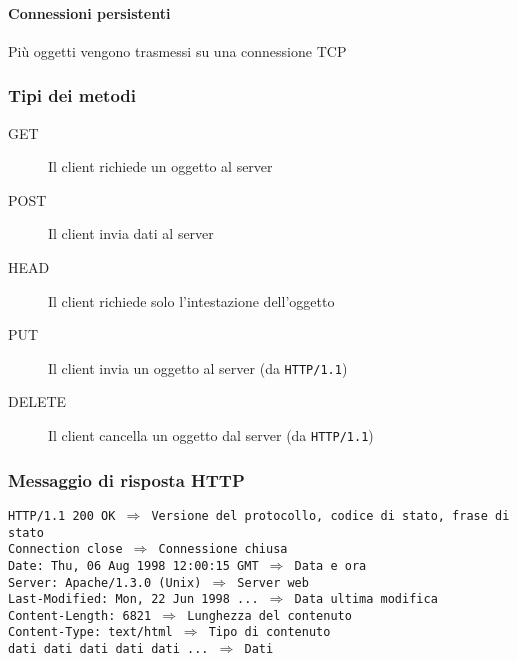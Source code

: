             \paragraph{Connessioni persistenti} Più oggetti vengono trasmessi su una connessione \Acrshort*{TCP}
        \subsubsection{Tipi dei metodi}
            \begin{description}
                \item[GET] Il client richiede un oggetto al server 
                \item[POST] Il client invia dati al server
                \item[HEAD] Il client richiede solo l'intestazione dell'oggetto
                \item[PUT] Il client invia un oggetto al server (da \texttt{HTTP/1.1})
                \item[DELETE] Il client cancella un oggetto dal server (da \texttt{HTTP/1.1})
            \end{description}
        \subsubsection{Messaggio di risposta HTTP}
            \texttt{HTTP/1.1 200 OK $\Rightarrow$ Versione del protocollo, codice di stato, frase di stato\\
                Connection close $\Rightarrow$ Connessione chiusa\\
                Date: Thu, 06 Aug 1998 12:00:15 GMT $\Rightarrow$ Data e ora\\
                Server: Apache/1.3.0 (Unix) $\Rightarrow$ Server web\\
                Last-Modified: Mon, 22 Jun 1998 ... $\Rightarrow$ Data ultima modifica\\
                Content-Length: 6821 $\Rightarrow$ Lunghezza del contenuto\\
                Content-Type: text/html $\Rightarrow$ Tipo di contenuto\\
                dati dati dati dati dati  ... $\Rightarrow$ Dati
            }
